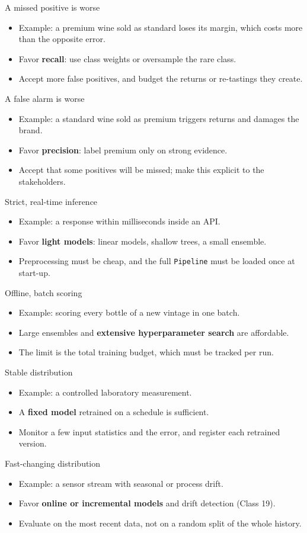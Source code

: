 {A missed positive is worse}
{\begin{itemize}
\item Example: a premium wine sold as standard loses its margin, which costs more than the opposite error.
\item Favor \textbf{recall}: use class weights or oversample the rare class.
\item Accept more false positives, and budget the returns or re-tastings they create.
\end{itemize}}
{A false alarm is worse}
{\begin{itemize}
\item Example: a standard wine sold as premium triggers returns and damages the brand.
\item Favor \textbf{precision}: label premium only on strong evidence.
\item Accept that some positives will be missed; make this explicit to the stakeholders.
\end{itemize}}

{Strict, real-time inference}
{\begin{itemize}
\item Example: a response within milliseconds inside an API.
\item Favor \textbf{light models}: linear models, shallow trees, a small ensemble.
\item Preprocessing must be cheap, and the full \texttt{Pipeline} must be loaded once at start-up.
\end{itemize}}
{Offline, batch scoring}
{\begin{itemize}
\item Example: scoring every bottle of a new vintage in one batch.
\item Large ensembles and \textbf{extensive hyperparameter search} are affordable.
\item The limit is the total training budget, which must be tracked per run.
\end{itemize}}

{Stable distribution}
{\begin{itemize}
\item Example: a controlled laboratory measurement.
\item A \textbf{fixed model} retrained on a schedule is sufficient.
\item Monitor a few input statistics and the error, and register each retrained version.
\end{itemize}}
{Fast-changing distribution}
{\begin{itemize}
\item Example: a sensor stream with seasonal or process drift.
\item Favor \textbf{online or incremental models} and drift detection (Class 19).
\item Evaluate on the most recent data, not on a random split of the whole history.
\end{itemize}}

